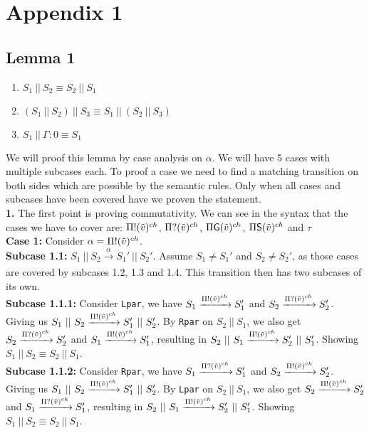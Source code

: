 \chapter{Appendix 1}
\section{Lemma 1}
\begin{lemma}
    \begin{enumerate}
    \item $S_1 \ || \ S_2 \equiv S_2\ ||\ S_1$
    \item $(S_1 \ ||\ S_2 )\ || \ S_3 \equiv S_1 \ ||\ (S_2 \ || \ S_3)$
    \item $S_1 \ || \ \Gamma : 0 \equiv S_1$
\end{enumerate}
\end{lemma}
We will proof this lemma by case analysis on $\alpha$. We will have 5 cases with multiple subcases each. To proof a case we need to find a matching transition on both sides which are possible by the semantic rules. Only when all cases and subcases have been covered have we proven the statement.\\
\textbf{1. }The first point is proving commutativity. We can see in the syntax that the cases we have to cover are: $\Pi ! (\Tilde{v})^{ch}$, $\Pi ? (\Tilde{v})^{ch}$, $ \Pi \mathsf{G}(\Tilde{v})^{ch}$, $ \Pi \mathsf{S}(\Tilde{v})^{ch}$ and $ \tau$\\
\textbf{Case 1: } Consider $\alpha = \Pi ! (\Tilde{v})^{ch}$.\\
\indent \textbf{Subcase 1.1: }$S_1 \ || \ S_2 \xrightarrow[]{\alpha} S_1' \ || \ S_2'$. Assume $S_1\not= S_1'$ and $S_2\not= S_2'$, as those cases are covered by subcases 1.2, 1.3 and 1.4. This transition then has two subcases of its own.\\
\indent \indent \textbf{Subcase 1.1.1: } Consider \texttt{Lpar}, we have $S_1 \xrightarrow[]{\Pi ! (\Tilde{v})^{ch}} S_1' $ and $ S_2 \xrightarrow[]{\Pi ? (\Tilde{v})^{ch}} S_2'$. Giving us $S_1 \ || \ S_2 \xrightarrow[]{\Pi ! (\Tilde{v})^{ch}} S_1 ' \ || \ S_2'$. By \texttt{Rpar} on $S_2\ ||\ S_1$, we also get $ S_2 \xrightarrow[]{\Pi ? (\Tilde{v})^{ch}} S_2'$ and $S_1 \xrightarrow[]{\Pi ! (\Tilde{v})^{ch}} S_1' $, resulting in $S_2 \ || \ S_1 \xrightarrow[]{\Pi ! (\Tilde{v})^{ch}} S_2 ' \ || \ S_1'$. Showing $S_1 \ || \ S_2 \equiv S_2\ ||\ S_1$.\\
\indent \indent \textbf{Subcase 1.1.2: } Consider \texttt{Rpar}, we have $S_1 \xrightarrow[]{\Pi ? (\Tilde{v})^{ch}} S_1' $ and $ S_2 \xrightarrow[]{\Pi ! (\Tilde{v})^{ch}} S_2'$. Giving us $S_1 \ || \ S_2 \xrightarrow[]{\Pi ! (\Tilde{v})^{ch}} S_1 ' \ || \ S_2'$. By \texttt{Lpar} on $S_2\ ||\ S_1$, we also get $ S_2 \xrightarrow[]{\Pi ! (\Tilde{v})^{ch}} S_2'$ and $S_1 \xrightarrow[]{\Pi ? (\Tilde{v})^{ch}} S_1' $, resulting in $S_2 \ || \ S_1 \xrightarrow[]{\Pi ! (\Tilde{v})^{ch}} S_2 ' \ || \ S_1'$. Showing $S_1 \ || \ S_2 \equiv S_2\ ||\ S_1$.\\
